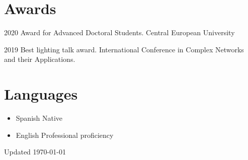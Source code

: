 \documentclass{academiccv}
\begin{document}
\section*{Awards}
\begin{tablist}
	\item[2020] \tab Award for Advanced Doctoral Students. Central European University 
	\item[2019] \tab Best lighting talk award. International Conference in Complex Networks and their Applications. 
\end{tablist}




\section*{Languages}
\begin{itemize}
	\item Spanish \tab Native
	\item English \tab Professional proficiency
\end{itemize}

\begin{center}
\vspace{6em}
Updated \monthyeardate\today
\end{center}
\end{document}
